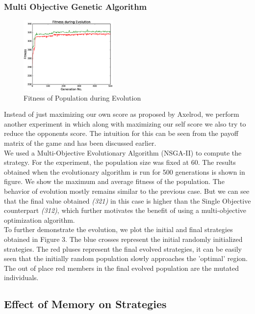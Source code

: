 \documentclass[a4paper]{article}
\begin{document}
	\subsubsection{Multi Objective Genetic Algorithm}
		
	\begin{figure}
	\centering
	\includegraphics[width=0.43\textwidth]{multFitPlot.eps}
	\caption{\footnotesize{Fitness of Population during Evolution}}
	\end{figure}
	
	Instead of just maximizing our own score as proposed by Axelrod, we perform another experiment in which along with maximizing our self score we also try to reduce the opponents score. The intuition for this can be seen from the payoff matrix of the game and has been discussed earlier.\\
	We used a Multi-Objective Evolutionary Algorithm (NSGA-II) to compute the strategy. For the experiment, the population size was fixed at 60. The results obtained when the evolutionary algorithm is run for 500 generations is shown in figure. We show the maximum and average fitness of the population. The behavior of evolution mostly remains similar to the previous case. But we can see that the final value obtained \textit{(321)} in this case is higher than the Single Objective counterpart \textit{(312)}, which further motivates the benefit of using a multi-objective optimization algorithm.\\

	To further demonstrate the evolution, we plot the initial and final strategies obtained in Figure 3. The blue crosses represent the initial randomly initialized strategies. The red pluses represent the final evolved strategies, it can be easily seen that the initially random population slowly approaches the 'optimal' region. The out of place red members in the final evolved population are the mutated individuals.
	
	\subsection{Effect of Memory on Strategies}
	
\end{document}
